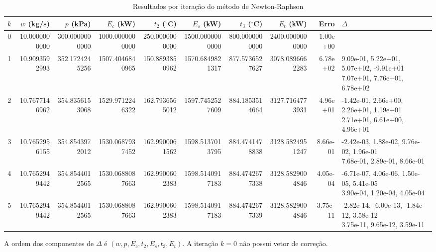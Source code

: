 \documentclass[11pt]{article}
\begin{document}
\begin{table}[htbp]
\centering
\caption{Resultados por iteração do método de Newton-Raphson}
\scriptsize
\setlength{\tabcolsep}{2.4pt}
\renewcommand{\arraystretch}{3}
\begin{tabular}{@{}r r r r r r r r r m{5.5cm}@{}}
\toprule
$k$ & $w$ (kg/s) & $p$ (kPa) & $E_c$ (kW) & $t_2$ ($^\circ$C) & $E_s$ (kW) & $t_3$ ($^\circ$C) & $E_t$ (kW) & Erro & $\Delta$ \\
\midrule
0 & 10.0000000000 & 300.0000000000 & 1000.0000000000 & 250.0000000000 & 1500.0000000000 & 800.0000000000 & 2400.0000000000 & 1.00e+00 &  \\
1 & 10.9093592993 & 352.1724245256 & 1507.4046840965 & 150.8893850962 & 1570.6849821317 & 877.5736527627 & 3078.0896662283 & 6.78e+02 & \shortstack[l]{9.09e-01, 5.22e+01, 5.07e+02, -9.91e+01 \\ 7.07e+01, 7.76e+01, 6.78e+02} \\
2 & 10.7677146962 & 354.8356153068 & 1529.9712246322 & 162.7936565012 & 1597.7452527609 & 884.1853514664 & 3127.7164773931 & 4.96e+01 & \shortstack[l]{-1.42e-01, 2.66e+00, 2.26e+01, 1.19e+01 \\ 2.71e+01, 6.61e+00, 4.96e+01} \\
3 & 10.7652956155 & 354.8543972012 & 1530.0687937452 & 162.9900061562 & 1598.5137013795 & 884.4741478838 & 3128.5824951247 & 8.66e-01 & \shortstack[l]{-2.42e-03, 1.88e-02, 9.76e-02, 1.96e-01 \\ 7.68e-01, 2.89e-01, 8.66e-01} \\
4 & 10.7652949442 & 354.8544012565 & 1530.0688087663 & 162.9900602383 & 1598.5140917183 & 884.4742677338 & 3128.5829004846 & 4.05e-04 & \shortstack[l]{-6.71e-07, 4.06e-06, 1.50e-05, 5.41e-05 \\ 3.90e-04, 1.20e-04, 4.05e-04} \\
5 & 10.7652949442 & 354.8544012565 & 1530.0688087663 & 162.9900602383 & 1598.5140917183 & 884.4742677339 & 3128.5829004846 & 3.75e-11 & \shortstack[l]{-2.82e-14, -6.00e-13, -1.84e-12, 3.58e-12 \\ 3.75e-11, 9.65e-12, 3.59e-11} \\
\bottomrule
\end{tabular}
\end{table}

\begin{center}
A ordem dos componentes de $\Delta$ é $(w,p,E_c,t_2,E_s,t_3,E_t)$. A iteração $k=0$ não possui vetor de correção.
\end{center}
\end{document}
